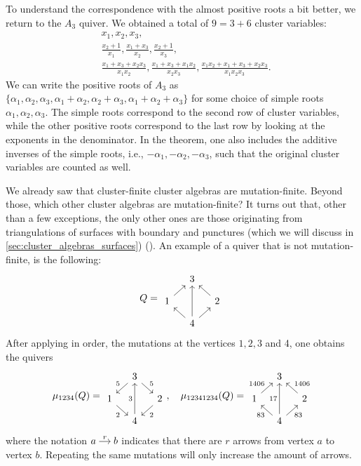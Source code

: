 To understand the correspondence with the almost positive roots a bit better, we return
to the $A_3$ quiver. We obtained a total of $9 = 3 + 6$ cluster variables:
\begin{align*}
	 & x_1, x_2, x_3,                                                                                               \\
	 & \frac{x_2 + 1}{x_1}, \frac{x_1 + x_3}{x_2}, \frac{x_2 + 1}{x_3},                                             \\
	 & \frac{x_1+x_3+x_2x_3}{x_1x_2}, \frac{x_1+x_3+x_1x_2}{x_2x_3}, \frac{x_1x_2 + x_1 + x_3 + x_2x_3}{x_1x_2x_3}.
\end{align*}
%
We can write the positive roots of $A_3$ as $\{\alpha_1, \alpha_2, \alpha_3, \alpha_1 +
	\alpha_2, \alpha_2 + \alpha_3, \alpha_1 + \alpha_2 + \alpha_3\}$ for some choice of
simple roots $\alpha_1, \alpha_2, \alpha_3$. The simple roots correspond to the second
row of cluster variables, while the other positive roots correspond to the last row by
looking at the exponents in the denominator. In the theorem, one also includes the
additive inverses of the simple roots, i.e., $-\alpha_1, -\alpha_2, -\alpha_3$, such
that the original cluster variables are counted as well.

We already saw that cluster-finite cluster algebras are mutation-finite. Beyond those,
which other cluster algebras are mutation-finite? It turns out that, other than a few
exceptions, the only other ones are those originating from triangulations of surfaces
with boundary and punctures (which we will discuss in
\cref{sec:cluster_algebras_surfaces}) (\cite{FeliksonShapiroTumarkin2012SkewSCA}). An
example of a quiver that is not mutation-finite, is the following:
\begin{equation*}
	Q =
	\begin{tikzcd}[sep = small]
		& 3 & \\
		1 \urar &&2 \ular \\
		& 4 \ular \ar[uu] \urar
	\end{tikzcd}
\end{equation*}
%
After applying in order, the mutations at the vertices $1,2,3$ and 4, one obtains the
quivers
\begin{equation*}
	\mu_{1234}(Q) =
	\begin{tikzcd}[sep = small]
		& 3 & \\
		1 \urar[leftarrow, "5"] &&2 \ular[leftarrow, "5"'] \\
		& 4 \ular[leftarrow, "2"] \ar[uu, "3"] \urar[leftarrow, "2"']
	\end{tikzcd}
	,\quad \mu_{12341234}(Q) =
	\begin{tikzcd}[sep = small]
		& 3 & \\
		1 \urar["1406"] &&2 \ular["1406"'] \\
		& 4 \ular["83"] \ar[uu, "17"] \urar["83"']
	\end{tikzcd}
\end{equation*}
%
where the notation $\begin{tikzcd}[cramped, sep=small]
		a \ar[r, "r"] &b
	\end{tikzcd}$ indicates that there are $r$ arrows from vertex $a$ to vertex $b$. Repeating the same mutations will only increase the amount of arrows.

